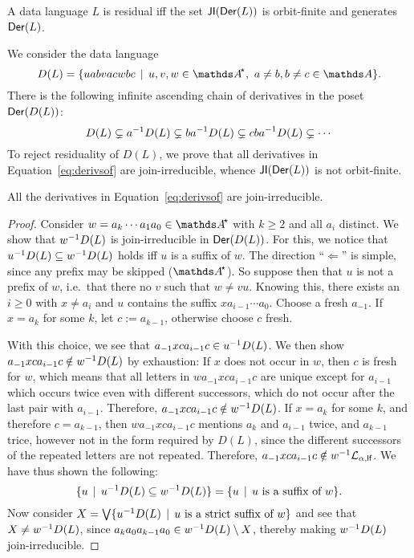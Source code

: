 \documentclass[a4paper,UKenglish,cleveref,autoref,thm-restate,numberwithinsect,final]{lipics-v2021}
\begin{document}
      \begin{theorem}[{\cite[Thm.~4.10]{ms22}}]
        A data language $L$ is residual iff the set $\mathsf{JI}(\mathsf{Der}(L))$ is orbit-finite and generates $\mathsf{Der}(L)$.
      \end{theorem}
      We consider the data language
      \[ D(L) = \setw{{u}ab{v}ac{w}bc}{{u}, {v}, {w} \in \Ats,\ a \neq b, b \neq c \in \names}. \]
      There is the following infinite ascending chain of derivatives in the poset $\mathsf{Der}(D(L))$:
      \begin{equation} \label{eq:derivsof}
        D(L) \subsetneq {a}^{-1}D(L) \subsetneq {ba}^{-1}D(L) \subsetneq {cba}^{-1}D(L) \subsetneq \cdots
      \end{equation}
      To reject residuality of $D(L)$, we prove that all derivatives in Equation~\eqref{eq:derivsof} are join-irreducible, whence $\mathsf{JI}(\mathsf{Der}(L))$ is not orbit-finite.
      \begin{lemma}
        All the derivatives in Equation~\eqref{eq:derivsof} are join-irreducible.
      \end{lemma}
      \begin{proof}
        Consider $w = a_k \cdots a_1 a_0 \in \Ats$ with $k \geqslant 2$ and all $a_i$ distinct.
        We show that ${w}^{-1}D(L)$ is join-irreducible
        in $\mathsf{Der}(D(L))$. For this, we notice that $\deriv{u}{%
        D(L)} \seq \deriv{w}{D(L)}$
        holds iff $u$ is a suffix of $w$. The direction ``$\Leftarrow$'' is simple, since any
        prefix may be skipped ($\Ats$). So suppose then that $u$ is not a prefix of $w$, i.e.~that
        there no $v$ such that $w \neq vu$. Knowing this, there exists an $i \geqslant 0$ with
        $x \neq a_i$ and $u$ contains the suffix $xa_{i - 1}\cdots a_0$. Choose a fresh $a_{-1}$.
        If $x = a_k$ for some $k$, let $c := a_{k - 1}$, otherwise choose $c$ fresh. 
        
        With this
        choice, we see that $a_{-1}xca_{i-1}c \in {u}^{-1}D(L)$.
        We then show $a_{-1}xca_{i-1}c \notin {w}^{-1}D(L)$
        by exhaustion: If $x$ does not occur in $w$, then $c$ is fresh for $w$, which means that
        all letters in $wa_{-1}xca_{i-1}c$ are unique except for $a_{i - 1}$ which occurs twice
        even with different successors, which do not occur after the last pair with $a_{i - 1}$.
        Therefore, $a_{-1}xca_{i-1}c \notin {w}^{-1}D(L)$.
        If $x = a_k$ for some $k$, and therefore $c = a_{k - 1}$, then $wa_{-1}xca_{i-1}c$ mentions
        $a_k$ and $a_{i - 1}$ twice, and $a_{k - 1}$ trice, however not in the form required by
        $D(L)$, since the different successors of the repeated letters
        are not repeated. Therefore, $a_{-1}xca_{i-1}c \notin {w}^{-1}\mathcal{L}_{\alpha,
        \textsf{lf}}$. We have thus shown the following:
        \[%
            \setw{u}{\deriv{u}{D(L)} \seq
            \deriv{w}{D(L)}} =
            \setw{u}{u \text{ is a suffix of } w}.
        \]
        Now consider $X = \bigvee\{{u}^{-1}D(L)\,\mid\,u\text{ is a
        strict suffix of } w\}$ and see that $X \neq {w}^{-1}D(L)$,
        since $a_ka_0a_{k-1}a_0 \in {w}^{-1}D(L) \setminus X$,
        thereby making ${w}^{-1}D(L)$ join-irreducible.
      \end{proof}
\end{document}
